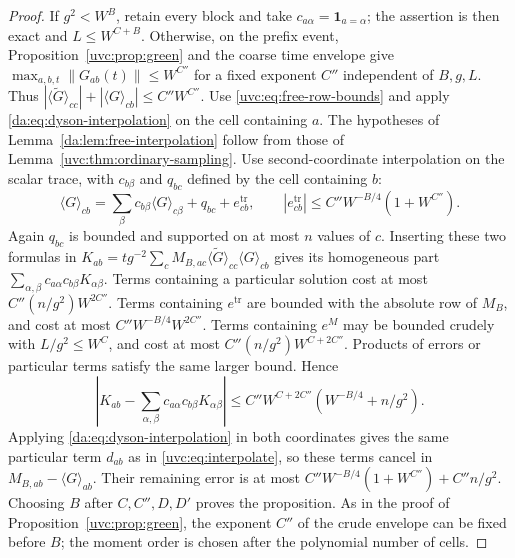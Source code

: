 \documentclass[11pt]{article}
\numberwithin{equation}{section}
\theoremstyle{remark}
\newcommand{\wt}{\widetilde}
\newcommand{\one}{\mathbf 1}
\begin{document}
\begin{proof}
If $g^2<W^B$, retain every block and take
$c_{a\alpha}=\one_{a=\alpha}$; the assertion is then exact and
$L\le W^{C+B}$. Otherwise, on the prefix event,
Proposition~\ref{uvc:prop:green} and the coarse time envelope give
$\max_{a,b,t}\|G_{ab}(t)\|\le W^{C''}$ for a fixed exponent $C''$
independent of $B,g,L$.
Thus $|\langle\wt G\rangle_{cc}|+|\langle G\rangle_{cb}|\le C''W^{C''}$.
Use \eqref{uvc:eq:free-row-bounds} and apply
\eqref{da:eq:dyson-interpolation} on the cell containing $a$.
The hypotheses of Lemma~\ref{da:lem:free-interpolation} follow from those of
Lemma~\ref{uvc:thm:ordinary-sampling}.
Use second-coordinate interpolation on the scalar trace, with
$c_{b\beta}$ and $q_{bc}$ defined by the cell containing $b$:
\[
 \langle G\rangle_{cb}=\sum_\beta c_{b\beta}\langle G\rangle_{c\beta}
                 +q_{bc}+e_{cb}^{\mathrm{tr}},\qquad
 |e_{cb}^{\mathrm{tr}}|\le C''W^{-B/4}(1+W^{C''}).
\]
Again $q_{bc}$ is bounded and supported on at most $n$ values of
$c$.  Inserting these two formulas in
$K_{ab}=t g^{-2}\sum_cM_{B,ac}\langle\wt G\rangle_{cc}\langle G\rangle_{cb}$ gives its homogeneous
part $\sum_{\alpha,\beta}c_{a\alpha}c_{b\beta}K_{\alpha\beta}$.
Terms containing a particular solution cost at most
$C''(n/g^2)W^{2C''}$.  Terms containing $e^{\mathrm{tr}}$ are bounded with the
absolute row of $M_B$, and cost at most $C''W^{-B/4}W^{2C''}$.
Terms containing $e^M$ may be bounded crudely with
$L/g^2\le W^C$, and cost at most $C''(n/g^2)W^{C+2C''}$.
Products of errors or particular terms satisfy the same larger
bound.  Hence
\[
 \left|K_{ab}-\sum_{\alpha,\beta}
                  c_{a\alpha}c_{b\beta}K_{\alpha\beta}\right|
 \le C''W^{C+2C''}(W^{-B/4}+n/g^2).
\]
Applying \eqref{da:eq:dyson-interpolation} in both coordinates gives the
same particular term $d_{ab}$ as in \eqref{uvc:eq:interpolate}, so these
terms cancel in $M_{B,ab}-\langle G\rangle_{ab}$. Their remaining
error is at most $C''W^{-B/4}(1+W^{C''})+C''n/g^2$.
Choosing $B$ after $C,C'',D,D'$ proves the proposition.  As in the proof of
Proposition~\ref{uvc:prop:green}, the exponent $C''$ of the crude
envelope can be fixed before $B$; the moment order is chosen after
the polynomial number of cells.
\end{proof}
\end{document}
